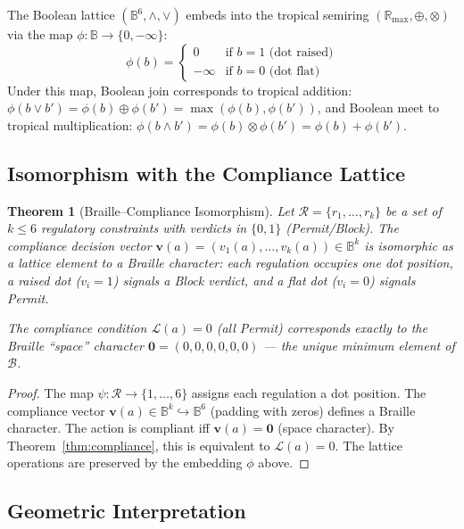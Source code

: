 \documentclass[11pt,twocolumn]{article}
\newtheorem{theorem}{Theorem}
\newcommand{\tplus}{\oplus}
\newcommand{\ttimes}{\otimes}
\newcommand{\R}{\mathbb{R}}
\newcommand{\Rmax}{\R_{\max}}
\begin{document}
The Boolean lattice $(\mathbb{B}^6, \wedge, \vee)$ embeds into the tropical
semiring $(\Rmax, \tplus, \ttimes)$ via the map $\phi : \mathbb{B} \to \{0, -\infty\}$:
\begin{equation}
  \phi(b) = \begin{cases} 0 & \text{if } b = 1 \text{ (dot raised)} \\
                          -\infty & \text{if } b = 0 \text{ (dot flat)} \end{cases}
\end{equation}
Under this map, Boolean join corresponds to tropical addition:
$\phi(b \vee b') = \phi(b) \tplus \phi(b') = \max(\phi(b), \phi(b'))$,
and Boolean meet to tropical multiplication:
$\phi(b \wedge b') = \phi(b) \ttimes \phi(b') = \phi(b) + \phi(b')$.

\subsection{Isomorphism with the Compliance Lattice}

\begin{theorem}[Braille--Compliance Isomorphism]
\label{thm:braille}
Let $\mathcal{R} = \{r_1, \ldots, r_k\}$ be a set of $k \leq 6$ regulatory
constraints with verdicts in $\{0, 1\}$ (Permit/Block). The compliance decision
vector $\mathbf{v}(a) = (v_1(a), \ldots, v_k(a)) \in \mathbb{B}^k$ is isomorphic
as a lattice element to a Braille character: each regulation occupies one dot
position, a raised dot ($v_i = 1$) signals a Block verdict, and a flat dot
($v_i = 0$) signals Permit.

The compliance condition $\mathcal{L}(a) = 0$ (all Permit) corresponds exactly
to the Braille ``space'' character $\mathbf{0} = (0,0,0,0,0,0)$ — the unique
minimum element of $\mathcal{B}$.
\end{theorem}

\begin{proof}
The map $\psi: \mathcal{R} \to \{1,\ldots,6\}$ assigns each regulation a dot
position. The compliance vector $\mathbf{v}(a) \in \mathbb{B}^k \hookrightarrow
\mathbb{B}^6$ (padding with zeros) defines a Braille character. The action is
compliant iff $\mathbf{v}(a) = \mathbf{0}$ (space character). By Theorem~\ref{thm:compliance},
this is equivalent to $\mathcal{L}(a) = 0$. The lattice operations are preserved
by the embedding $\phi$ above.
\end{proof}

\subsection{Geometric Interpretation}
\end{document}
